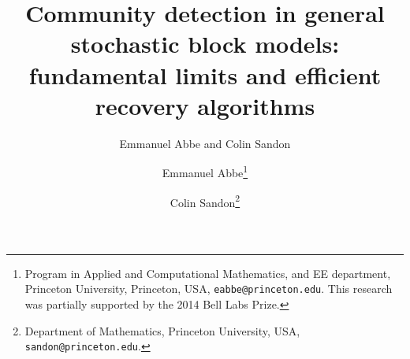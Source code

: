 \documentclass[11pt]{article}
\newcommand{\1}{\mathbb{1}}
\begin{document}
\title{Community detection in general stochastic block models: \\ fundamental limits and efficient recovery algorithms}
\author{Emmanuel Abbe and Colin Sandon}

\author{Emmanuel Abbe\thanks{Program in Applied and Computational Mathematics, and EE department, Princeton University, Princeton, USA, \texttt{eabbe@princeton.edu}. This research was partially supported by the 2014 Bell Labs Prize.} \and 
Colin Sandon\thanks{Department of Mathematics, Princeton University, USA,
\texttt{sandon@princeton.edu}.
}}

\date{}
\maketitle
\end{document}
